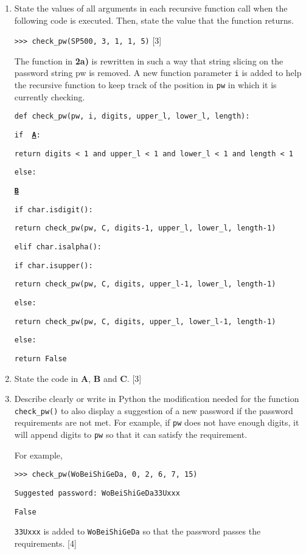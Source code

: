 \begin{enumerate}
\item State the values of all arguments in each recursive function call
when the following code is executed. Then, state the value that the
function returns. 

\texttt{>\textcompwordmark >\textcompwordmark > check\_pw(\textquotedbl SP500\textquotedbl ,
3, 1, 1, 5)} \hfill{}{[}3{]}

The function in \textbf{2a)} is rewritten in such a way that string
slicing on the password string pw is removed. A new function parameter
\texttt{i} is added to help the recursive function to keep track of
the position in \texttt{pw} in which it is currently checking. 

\noindent\begin{minipage}[t]{1\columnwidth}%
\texttt{def check\_pw(pw, i, digits, upper\_l, lower\_l, length): }

\texttt{if}\texttt{\textbf{ }}\texttt{\textbf{\uline{A}}}\texttt{: }

\texttt{\qquad{}return digits < 1 and upper\_l < 1 and lower\_l <
1 and length < 1 }

\texttt{else: }

\texttt{\qquad{}}\texttt{\textbf{\uline{B}}}\texttt{ }

\texttt{\qquad{}if char.isdigit(): }

\texttt{\qquad{}\qquad{}return check\_pw(pw, C, digits-1, upper\_l,
lower\_l, length-1) }

\texttt{\qquad{}elif char.isalpha(): }

\texttt{\qquad{}\qquad{}if char.isupper(): }

\texttt{\qquad{}\qquad{}\qquad{}return check\_pw(pw, C, digits,
upper\_l-1, lower\_l, length-1) }

\texttt{\qquad{}\qquad{}else: }

\texttt{\qquad{}\qquad{}\qquad{}return check\_pw(pw, C, digits,
upper\_l, lower\_l-1, length-1) }

\texttt{\qquad{}\qquad{}else: }

\texttt{\qquad{}\qquad{}\qquad{}return False }%
\end{minipage}
\item State the code in \textbf{A}, \textbf{B} and \textbf{C}. \hfill{}{[}3{]}
\item Describe clearly or write in Python the modification needed for the
function \texttt{check\_pw()} to also display a suggestion of a new
password if the password requirements are not met. For example, if
\texttt{pw} does not have enough digits, it will append digits to
\texttt{pw} so that it can satisfy the requirement. 

For example, 

\texttt{>\textcompwordmark >\textcompwordmark > check\_pw(\textquotedbl WoBeiShiGeDa\textquotedbl ,
0, 2, 6, 7, 15) }

\texttt{Suggested password: WoBeiShiGeDa33Uxxx }

\texttt{False }

\texttt{\textquotedbl 33Uxxx\textquotedbl} is added to \texttt{\textquotedbl WoBeiShiGeDa\textquotedbl}
so that the password passes the requirements. \hfill{}{[}4{]}
\end{enumerate}